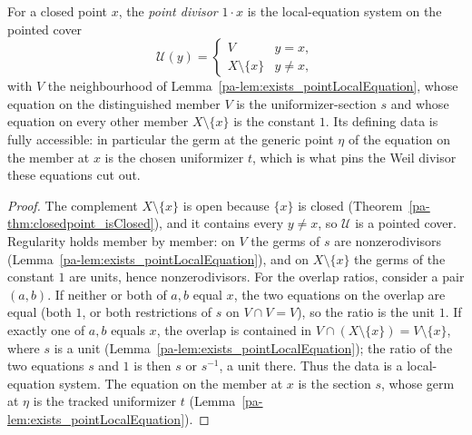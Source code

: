 \begin{definition}
  \label{pa-def:pointDivisor}
  \leanok

  For a closed point \(x\), the \emph{point divisor} \(1 \cdot x\) is the local-equation system on
  the pointed cover
  \[
    \mathcal U(y) = \begin{cases} V & y = x, \\ X \setminus \{x\} & y \neq x, \end{cases}
  \]
  with \(V\) the neighbourhood of Lemma~\ref{pa-lem:exists_pointLocalEquation}, whose equation on the
  distinguished member \(V\) is the uniformizer-section \(s\) and whose equation on every other
  member \(X \setminus \{x\}\) is the constant \(1\). Its defining data is fully accessible: in
  particular the germ at the generic point \(\eta\) of the equation on the member at \(x\) is the
  chosen uniformizer \(t\), which is what pins the Weil divisor these equations cut out.
\end{definition}
\begin{proof}
  \leanok
  The complement \(X \setminus \{x\}\) is open because \(\{x\}\) is closed
  (Theorem~\ref{pa-thm:closedpoint_isClosed}), and it contains every \(y \neq x\), so \(\mathcal U\) is
  a pointed cover. Regularity holds member by member: on \(V\) the germs of \(s\) are
  nonzerodivisors (Lemma~\ref{pa-lem:exists_pointLocalEquation}), and on \(X \setminus \{x\}\) the
  germs of the constant \(1\) are units, hence nonzerodivisors. For the overlap ratios, consider a
  pair \((a, b)\). If neither or both of \(a, b\) equal \(x\), the two equations on the overlap are
  equal (both \(1\), or both restrictions of \(s\) on \(V \cap V = V\)), so the ratio is the unit
  \(1\). If exactly one of \(a, b\) equals \(x\), the overlap is contained in \(V \cap (X \setminus
  \{x\}) = V \setminus \{x\}\), where \(s\) is a unit (Lemma~\ref{pa-lem:exists_pointLocalEquation});
  the ratio of the two equations \(s\) and \(1\) is then \(s\) or \(s^{-1}\), a unit there. Thus the
  data is a local-equation system. The equation on the member at \(x\) is the section \(s\), whose
  germ at \(\eta\) is the tracked uniformizer \(t\) (Lemma~\ref{pa-lem:exists_pointLocalEquation}).
\end{proof}

